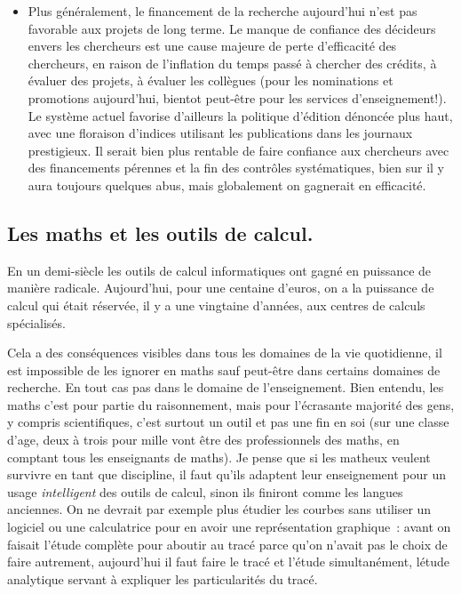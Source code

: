 \documentclass[a4paper,11pt]{article}
\begin{document}
\begin{itemize}
{du logiciel.}.
\item Plus g\'en\'eralement, le financement de la recherche
aujourd'hui n'est pas favorable aux projets de long terme.
Le manque de confiance des d\'ecideurs envers les chercheurs
est une cause majeure de perte d'efficacit\'e des chercheurs,
en raison de l'inflation du temps pass\'e \`a chercher des cr\'edits,
\`a \'evaluer des projets, \`a \'evaluer les coll\`egues
(pour les nominations et promotions aujourd'hui, bientot peut-\^etre pour les services
d'enseignement!). Le syst\`eme actuel favorise d'ailleurs la politique
d'\'edition d\'enonc\'ee plus haut, avec une floraison d'indices utilisant
les publications dans les journaux prestigieux. Il serait bien plus
rentable de faire confiance aux chercheurs avec des financements
p\'erennes et la fin des contr\^oles syst\'ematiques, bien sur il y aura
toujours quelques abus, mais globalement on gagnerait en efficacit\'e.
\end{itemize}

\subsection{Les maths et les outils de calcul.}
En un demi-si\`ecle les outils de calcul informatiques ont
gagn\'e en puissance de mani\`ere radicale. Aujourd'hui,
pour une centaine d'euros, on a la puissance de calcul
qui \'etait r\'eserv\'ee, il y a une vingtaine d'ann\'ees, 
aux centres de calculs sp\'ecialis\'es. 

Cela a des cons\'equences
visibles dans tous les domaines de la vie quotidienne, il
est impossible de les ignorer en maths sauf peut-\^etre
dans certains domaines de recherche. En tout
cas pas dans le domaine de l'enseignement. Bien entendu,
les maths c'est pour partie du raisonnement, mais pour
l'\'ecrasante majorit\'e des gens, y compris scientifiques,
c'est surtout un outil et pas une fin en soi (sur une classe
d'age, deux \`a trois pour mille vont
\^etre des professionnels des maths, en comptant tous les
enseignants de maths). Je pense que si les matheux veulent survivre
en tant que discipline, il faut qu'ils adaptent leur enseignement
pour un usage {\em intelligent} des outils de calcul, sinon ils finiront
comme les langues anciennes. On ne devrait par exemple 
plus \'etudier les courbes sans utiliser un logiciel ou une
calculatrice pour en avoir une repr\'esentation graphique~: 
avant on faisait l'\'etude compl\`ete pour aboutir au trac\'e 
parce qu'on n'avait pas le choix de faire autrement, aujourd'hui il faut
faire le trac\'e et l'\'etude simultan\'ement, l\'etude analytique
servant \`a expliquer les particularit\'es du trac\'e.
\end{document}
